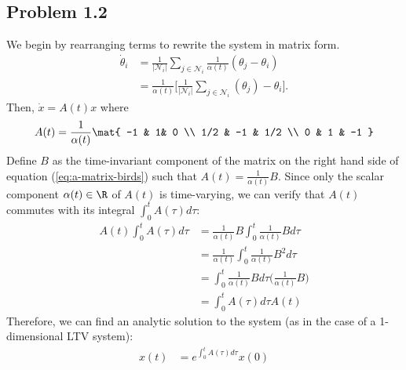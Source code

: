 \documentclass{homework}
\begin{document}
\subsection{Problem 1.2}
\renewcommand{\N}{\mathcal{N}}

\begin{letterenum}
    \item We begin by rearranging terms to rewrite the system in matrix
        form.
        \begin{align*}
            \dot{\theta}_i &= \frac{1}{|\N_i|} \sum_{j \in \N_i} \frac{1}{\alpha(t)}
                (\theta_j - \theta_i) \\
                &= \frac{1}{\alpha(t)}\biggl[
                    \frac{1}{|\N_i|} \sum_{j\in\N_i} (\theta_j) - \theta_i
                \biggr].
        \end{align*}
        Then, $\dot{x} = A(t) x$ where
        \begin{equation}
            A(t) = \frac{1}{\alpha(t)}\mat{
                -1 & 1& 0 \\
                1/2 & -1 & 1/2 \\
                0 & 1 & -1
            }
            \label{eq:a-matrix-birds}
        \end{equation}
        Define $B$ as the time-invariant component of the matrix on the
        right hand side of equation (\ref{eq:a-matrix-birds}) such that
        $A(t) = \frac{1}{\alpha(t)} B$. Since only the scalar component
        $\alpha(t)\in\R$ of $A(t)$ is time-varying, we can verify that $A(t)$
        commutes with its integral $\int_{0}^{t}A(\tau)d\tau$:
        \begin{align*}
            A(t) \int_{0}^{t}A(\tau)d\tau &=
                    \frac{1}{\alpha(t)}B
                    \int_{0}^{t}\frac{1}{\alpha(t)}B d\tau \\
                &= \frac{1}{\alpha(t)}
                    \int_{0}^{t}\frac{1}{\alpha(t)}B^2 d\tau \\
                &= \int_{0}^{t}\frac{1}{\alpha(t)}B d\tau
                    \biggl(\frac{1}{\alpha(t)}B\biggr)\\
                &= \int_{0}^{t} A(\tau)d\tau A(t)
        \end{align*}
        Therefore, we can find an analytic solution to the system (as in the
        case of a 1-dimensional LTV system):
        \begin{align}
            x(t) &= e^{\int_{0}^{t} A(\tau)d\tau} x(0) \\

\end{align}
\end{letterenum}
\end{document}
